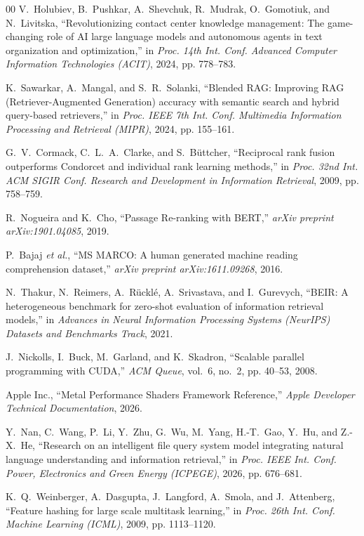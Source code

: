\documentclass[a4paper,12pt]{article}
\begin{document}
\begin{thebibliography}{00}
V.~Holubiev, B.~Pushkar, A.~Shevchuk, R.~Mudrak, O.~Gomotiuk, and N.~Livitska, ``Revolutionizing contact center knowledge management: The game-changing role of AI large language models and autonomous agents in text organization and optimization,'' in \emph{Proc. 14th Int. Conf. Advanced Computer Information Technologies (ACIT)}, 2024, pp. 778--783.

K.~Sawarkar, A.~Mangal, and S.~R.~Solanki, ``Blended RAG: Improving RAG (Retriever-Augmented Generation) accuracy with semantic search and hybrid query-based retrievers,'' in \emph{Proc. IEEE 7th Int. Conf. Multimedia Information Processing and Retrieval (MIPR)}, 2024, pp. 155--161.

G.~V.~Cormack, C.~L.~A.~Clarke, and S.~B{\"u}ttcher, ``Reciprocal rank fusion outperforms Condorcet and individual rank learning methods,'' in \emph{Proc. 32nd Int. ACM SIGIR Conf. Research and Development in Information Retrieval}, 2009, pp. 758--759.

R.~Nogueira and K.~Cho, ``Passage Re-ranking with BERT,'' \emph{arXiv preprint arXiv:1901.04085}, 2019.

P.~Bajaj \emph{et al.}, ``MS MARCO: A human generated machine reading comprehension dataset,'' \emph{arXiv preprint arXiv:1611.09268}, 2016.

N.~Thakur, N.~Reimers, A.~R{\"u}ckl{\'e}, A.~Srivastava, and I.~Gurevych, ``BEIR: A heterogeneous benchmark for zero-shot evaluation of information retrieval models,'' in \emph{Advances in Neural Information Processing Systems (NeurIPS) Datasets and Benchmarks Track}, 2021.

J.~Nickolls, I.~Buck, M.~Garland, and K.~Skadron, ``Scalable parallel programming with CUDA,'' \emph{ACM Queue}, vol.~6, no.~2, pp. 40--53, 2008.

Apple Inc., ``Metal Performance Shaders Framework Reference,'' \emph{Apple Developer Technical Documentation}, 2026.

Y.~Nan, C.~Wang, P.~Li, Y.~Zhu, G.~Wu, M.~Yang, H.-T.~Gao, Y.~Hu, and Z.-X.~He, ``Research on an intelligent file query system model integrating natural language understanding and information retrieval,'' in \emph{Proc. IEEE Int. Conf. Power, Electronics and Green Energy (ICPEGE)}, 2026, pp. 676--681.

K.~Q.~Weinberger, A.~Dasgupta, J.~Langford, A.~Smola, and J.~Attenberg, ``Feature hashing for large scale multitask learning,'' in \emph{Proc. 26th Int. Conf. Machine Learning (ICML)}, 2009, pp. 1113--1120.
\end{thebibliography}

\clearpage
\end{document}
